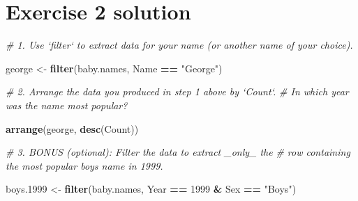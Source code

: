 \documentclass[]{book}
\newenvironment{Shaded}{\begin{snugshade}}{\end{snugshade}}
\newcommand{\KeywordTok}[1]{\textcolor[rgb]{0.13,0.29,0.53}{\textbf{#1}}}
\newcommand{\DecValTok}[1]{\textcolor[rgb]{0.00,0.00,0.81}{#1}}
\newcommand{\StringTok}[1]{\textcolor[rgb]{0.31,0.60,0.02}{#1}}
\newcommand{\CommentTok}[1]{\textcolor[rgb]{0.56,0.35,0.01}{\textit{#1}}}
\newcommand{\OperatorTok}[1]{\textcolor[rgb]{0.81,0.36,0.00}{\textbf{#1}}}
\newcommand{\NormalTok}[1]{#1}
\begin{document}
\section{Exercise 2 solution}\label{exercise-2-solution}

\begin{Shaded}
\begin{Highlighting}[]
\CommentTok{# 1.  Use `filter` to extract data for your name (or another name of your choice).  }
\end{Highlighting}
\end{Shaded}

\begin{Shaded}
\begin{Highlighting}[]
\NormalTok{george <-}\StringTok{ }\KeywordTok{filter}\NormalTok{(baby.names, Name }\OperatorTok{==}\StringTok{ "George"}\NormalTok{)}
\end{Highlighting}
\end{Shaded}

\begin{Shaded}
\begin{Highlighting}[]
\CommentTok{# 2.  Arrange the data you produced in step 1 above by `Count`. }
\CommentTok{#     In which year was the name most popular?}
\end{Highlighting}
\end{Shaded}

\begin{Shaded}
\begin{Highlighting}[]
\KeywordTok{arrange}\NormalTok{(george, }\KeywordTok{desc}\NormalTok{(Count))}
\end{Highlighting}
\end{Shaded}

\begin{Shaded}
\begin{Highlighting}[]
\CommentTok{# 3.  BONUS (optional): Filter the data to extract _only_ the }
\CommentTok{#     row containing the most popular boys name in 1999.}
\end{Highlighting}
\end{Shaded}

\begin{Shaded}
\begin{Highlighting}[]
\NormalTok{boys.}\DecValTok{1999}\NormalTok{ <-}\StringTok{ }\KeywordTok{filter}\NormalTok{(baby.names, }
\NormalTok{                    Year }\OperatorTok{==}\StringTok{ }\DecValTok{1999} \OperatorTok{&}\StringTok{ }\NormalTok{Sex }\OperatorTok{==}\StringTok{ "Boys"}\NormalTok{)}
\end{Highlighting}
\end{Shaded}
\end{document}
